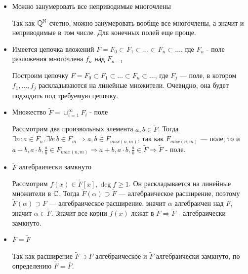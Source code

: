\begin{itemize}
    \item[а)] Можно занумеровать все неприводимые многочлены
    \par \Proof Так как $\mathbb{Q}^{\mathbb{N}}$ счетно, можно занумеровать вообще все многочлены, а значит и неприводимые в том числе. Для конечных полей еще проще. \EndProof
    
    \item[б)] Имеется цепочка вложений $F=F_0 \subset F_1 \subset \ldots \subset F_n \subset \ldots$, где $F_n$ - поле разложения многочлена $f_n$ над $F_{n-1}$
    \par \Proof Построим цепочку $F=F_0 \subset F_1 \subset \ldots \subset F_n \subset \ldots$, где $F_j$ — поле, в котором $f_1, \ldots, f_j$ раскладываются на линейные множители. Очевидно, она будет подходить под требуемую цепочку. \EndProof
    
    \item[в)] Множество $\tilde{F}=\cup_{i=1}^\infty F_i$ - поле
    \par \Proof Рассмотрим два произвольных элемента $a,b \in \tilde{F}$. Тогда $\exists n: a\in F_n, \exists b: b\in F_m \Rightarrow a,b \in F_{max(n,m)}$, так как $F_{max(n,m)}$ — поле, то и $a+b, a\cdot b, \frac{a}{b} \in F_{max(n,m)} \Rightarrow a+b, a\cdot b, \frac{a}{b} \in \tilde{F} \Rightarrow \tilde{F}$ - поле. \EndProof
    
    \item[г)] $\tilde{F}$ алгебраически замкнуто
    \par \Proof Рассмотрим $f(x) \in \tilde{F}[x], \deg f \geq 1$. Он раскладывается на линейные множители в $\mathbb{C}$. Тогда $\tilde{F}(\alpha) \supset \tilde{F}$ — алгебраическое расширение, поэтому $\tilde{F}(\alpha) \supset F$ — алгебраическое расширение, значит $\alpha$ алгебраичен над $F$, значит $\alpha \in \tilde{F}$. Значит все корни $f(x)$ лежат в $\tilde{F} \Rightarrow \tilde{F}$ - алгебраически замкнуто. \EndProof
    
    \item[д)] $\overline{F}=\tilde{F}$
    \par \Proof Так как расширение $\tilde{F} \supset F$ алгебраическое и $\tilde{F}$ алгебраически замкнуто, по определению $\tilde{F}=\overline{F}$. \EndProof
\end{itemize}
